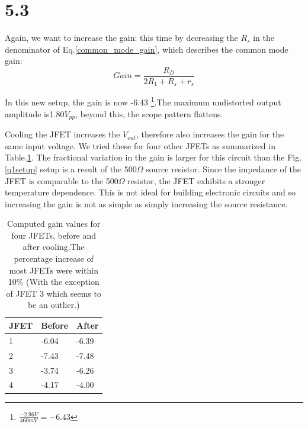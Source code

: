 \documentclass[authoryear, 12pt,5p, times]{elsarticle}
\begin{document}
\section*{5.3}
Again, we want to increase the gain: this time by decreasing the $R_s$ in the denominator of Eq.\ref{common_mode_gain}, which describes the common mode gain:
\begin{equation}
Gain = \frac{R_D}{2R_1+R_s+r_s}
\label{common_mode_gain}
\end{equation}
\par In this new setup, the gain is now  -6.43 \footnote{$\frac{-2.96V}{460mV}=-6.43$}.The maximum undistorted output amplitude is1.80$V_{pp}$, beyond this, the scope pattern flattens.
\par Cooling the JFET increases the $V_{out}$, therefore also increases the gain for the same input voltage. We tried these for four other JFETs as summarized in Table.\ref{gain_table}. The fractional variation in the gain is larger for this circuit than the Fig.\ref{q1setup} setup is a result of the 500$\Omega$ source resistor. Since the  impedance of the JFET is comparable to the 500$\Omega$ resistor, the JFET exhibits a stronger temperature dependence. This is not ideal for building electronic circuits and so increasing the gain is not as simple as simply increasing the source resistance.
\begin{table}[h!]
\centering
    \begin{tabular}{l|l|l}
    JFET & Before & After \\ \hline
    1    & -6.04  & -6.39 \\ \hline
    2    & -7.43  & -7.48 \\  \hline
    3    & -3.74  & -6.26 \\ \hline
    4    & -4.17  & -4.00 \\
    \end{tabular}
  \caption{Computed gain values for four JFETs, before and after cooling.The percentage increase of most JFETs were within 10\% (With the exception of JFET 3 which seems to be an  outlier.)}
\label{gain_table}\end{table}
\end{document}
